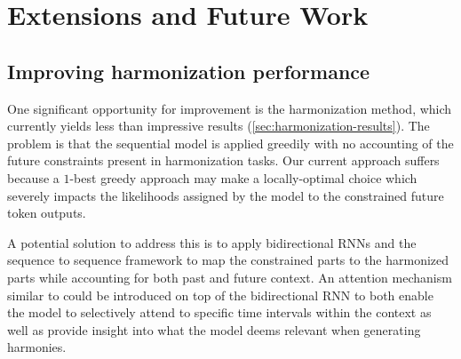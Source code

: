 


\section{Extensions and Future Work}\label{sec:future-work}

\subsection{Improving harmonization performance}

One significant opportunity for improvement is the harmonization method, which
currently yields less than impressive results
(\cref{sec:harmonization-results}). The problem is that the sequential model is
applied greedily with no accounting of the future constraints present in
harmonization tasks. Our current approach suffers because a $1$-best greedy
approach may make a locally-optimal choice which severely impacts the
likelihoods assigned by the model to the constrained future token outputs.

A potential solution to address this is to apply bidirectional
RNNs\citep{Graves2005} and the sequence to sequence
framework\citep{sutskever2014sequence} to map the constrained parts to the
harmonized parts while accounting for both past and future context. An
attention mechanism similar to \citet{Bahdanau2015} could be introduced on top
of the bidirectional RNN to both enable the model to selectively attend to
specific time intervals within the context as well as provide insight into what
the model deems relevant when generating harmonies.

